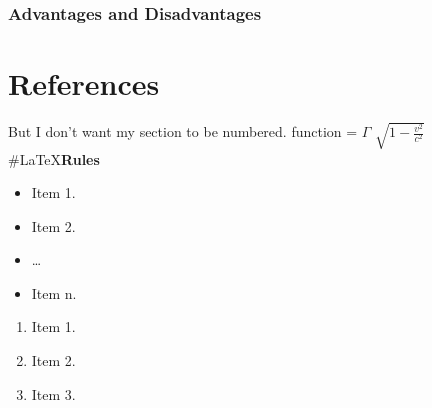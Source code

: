 \documentclass{report}
\begin{document}
\subsubsection{Advantages and Disadvantages}
\section{References}
But I don't want my section to be numbered. 
function = $\Gamma$
$\sqrt{1-\frac{v^2}{c^2}}$
\#\LaTeX\textbf{Rules}\!
\begin{itemize}
\item Item 1.
\item Item 2.
\item \ldots
\item Item n.
\end{itemize}
\begin{enumerate}
\item Item 1.
\item Item 2.
\item Item 3.
\end{enumerate}
\end{document}
